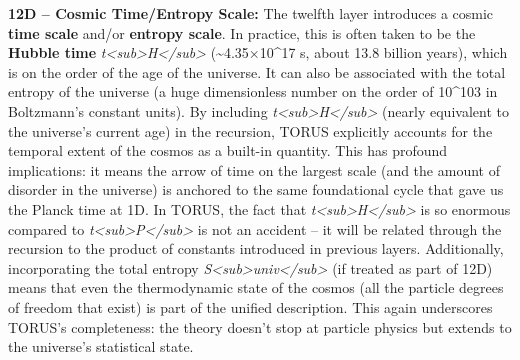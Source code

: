 \documentclass[]{article}
\begin{document}
\textbf{12D -- Cosmic Time/Entropy Scale:} The twelfth layer introduces
a cosmic \textbf{time scale} and/or \textbf{entropy scale}. In practice,
this is often taken to be the \textbf{Hubble time}
\emph{t\textless{}sub\textgreater{}H\textless{}/sub\textgreater{}}
(\textasciitilde{}4.35×10\^{}17 s, about 13.8 billion years), which is
on the order of the age of the universe. It can also be associated with
the total entropy of the universe (a huge dimensionless number on the
order of 10\^{}103 in Boltzmann's constant units). By including
\emph{t\textless{}sub\textgreater{}H\textless{}/sub\textgreater{}}
(nearly equivalent to the universe's current age) in the recursion,
TORUS explicitly accounts for the temporal extent of the cosmos as a
built-in quantity. This has profound implications: it means the arrow of
time on the largest scale (and the amount of disorder in the universe)
is anchored to the same foundational cycle that gave us the Planck time
at 1D. In TORUS, the fact that
\emph{t\textless{}sub\textgreater{}H\textless{}/sub\textgreater{}} is so
enormous compared to
\emph{t\textless{}sub\textgreater{}P\textless{}/sub\textgreater{}} is
not an accident -- it will be related through the recursion to the
product of constants introduced in previous layers. Additionally,
incorporating the total entropy
\emph{S\textless{}sub\textgreater{}univ\textless{}/sub\textgreater{}}
(if treated as part of 12D) means that even the thermodynamic state of
the cosmos (all the particle degrees of freedom that exist) is part of
the unified description. This again underscores TORUS's completeness:
the theory doesn't stop at particle physics but extends to the
universe's statistical state.
\end{document}
